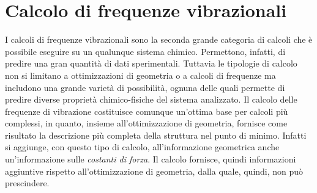 \documentclass[oneside]{amsbook}
\numberwithin{section}{chapter}
\numberwithin{equation}{section}
\numberwithin{figure}{section}
\begin{document}
\section{Calcolo di frequenze vibrazionali}
I calcoli di frequenze vibrazionali sono la seconda grande categoria di calcoli che è possibile eseguire su un qualunque sistema chimico. Permettono, infatti, di predire una gran quantità di dati sperimentali. Tuttavia le tipologie di calcolo non si limitano a ottimizzazioni di geometria o a calcoli di frequenze ma includono una grande varietà di possibilità, ognuna delle quali permette di predire diverse proprietà chimico-fisiche del sistema analizzato. Il calcolo delle frequenze di vibrazione costituisce comunque un'ottima base per calcoli più complessi, in quanto, insieme all'ottimizzazione di geometria, fornisce come risultato la descrizione più completa della struttura nel punto di minimo. Infatti si aggiunge, con questo tipo di calcolo, all'informazione geometrica anche un'informazione sulle \emph{costanti di forza}.
Il calcolo fornisce, quindi informazioni aggiuntive rispetto all'ottimizzazione di geometria, dalla quale, quindi, non può prescindere.
\end{document}
